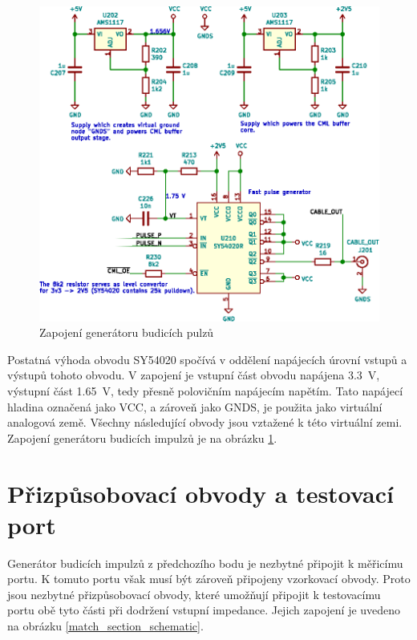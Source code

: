 \begin{figure}[htbp]
\includegraphics[width=\textwidth,keepaspectratio]{images/pulse_generator_section.eps}\caption{Zapojení generátoru budicích pulzů}\label{pulse_generator_section_schematic}
\end{figure}	

Postatná výhoda obvodu SY54020 spočívá v oddělení napájecích úrovní vstupů a výstupů tohoto obvodu. V zapojení je vstupní část obvodu napájena \SI{3.3}{\volt}, výstupní část \SI{1.65}{\volt}, tedy přesně polovičním napájecím napětím. Tato napájecí hladina označená jako VCC, a zároveň jako GNDS, je použita jako virtuální analogová země. Všechny následující obvody jsou vztažené k této virtuální zemi. Zapojení generátoru budicích impulzů je na obrázku \ref{pulse_generator_section_schematic}.

\section{Přizpůsobovací obvody a testovací port}
Generátor budicích impulzů z předchozího bodu je nezbytné připojit k měřicímu portu. K tomuto portu však musí být zároveň připojeny vzorkovací obvody. Proto jsou nezbytné přizpůsobovací obvody, které umožňují připojit k testovacímu portu obě tyto části při dodržení vstupní impedance. Jejich zapojení je uvedeno na obrázku \ref{match_section_schematic}.

